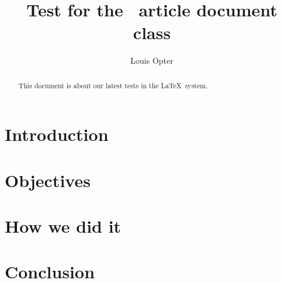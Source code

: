 \documentclass{rtxarticle}
\author{Louis Opter}
\title{Test for the \rtx\ article document class}
\begin{document}
\maketitle

\begin{abstract}
This document is about our latest tests in the \LaTeX\ system.
\end{abstract}

\rtxmaketitleblock

\section{Introduction}

\lipsum[1]

\section{Objectives}

\lipsum[2]

\section{How we did it}

\lipsum[3]

\section{Conclusion}

\lipsum[4]
\end{document}
